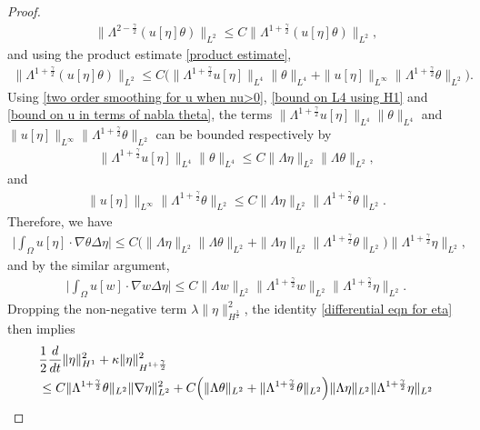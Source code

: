 \documentclass[10pt,a4paper]{amsart}
\newcommand{\intox}{\int_{\Omega}}
\begin{document}
\begin{proof}
\begin{align*}
\|\Lambda^{2-\frac{\gamma}{2}}(u[\eta]\theta)\|_{L^2}\le C\|\Lambda^{1+\frac{\gamma}{2}}(u[\eta]\theta)\|_{L^2},
\end{align*}
and using the product estimate \eqref{product estimate}, 
\begin{align*}
\|\Lambda^{1+\frac{\gamma}{2}}(u[\eta]\theta)\|_{L^2}\le C\Big(\|\Lambda^{1+\frac{\gamma}{2}}u[\eta]\|_{L^4}\|\theta\|_{L^4}+\|u[\eta]\|_{L^\infty}\|\Lambda^{1+\frac{\gamma}{2}}\theta\|_{L^2}\Big).
\end{align*}
Using \eqref{two order smoothing for u when nu>0}, \eqref{bound on L4 using H1} and \eqref{bound on u in terms of nabla theta}, the terms $\|\Lambda^{1+\frac{\gamma}{2}}u[\eta]\|_{L^4}\|\theta\|_{L^4}$ and $\|u[\eta]\|_{L^\infty}\|\Lambda^{1+\frac{\gamma}{2}}\theta\|_{L^2}$ can be bounded respectively by 
\begin{align*}
\|\Lambda^{1+\frac{\gamma}{2}}u[\eta]\|_{L^4}\|\theta\|_{L^4}\le C\|\Lambda\eta\|_{L^2}\|\Lambda\theta\|_{L^2},
\end{align*}
and 
\begin{align*}
\|u[\eta]\|_{L^\infty}\|\Lambda^{1+\frac{\gamma}{2}}\theta\|_{L^2}\le C\|\Lambda \eta\|_{L^2}\|\Lambda^{1+\frac{\gamma}{2}}\theta\|_{L^2}.
\end{align*}
Therefore, we have
\begin{align*}
\Big|\intox u[\eta]\cdot\nabla\theta\Delta\eta\Big|\le C\Big(\|\Lambda\eta\|_{L^2}\|\Lambda\theta\|_{L^2}+\|\Lambda \eta\|_{L^2}\|\Lambda^{1+\frac{\gamma}{2}}\theta\|_{L^2}\Big)\|\Lambda^{1+\frac{\gamma}{2}}\eta\|_{L^2},
\end{align*} 
and by the similar argument,
\begin{align*}
\Big|\intox u[w]\cdot\nabla w\Delta\eta\Big|\le C\|\Lambda w\|_{L^2}\|\Lambda^{1+\frac{\gamma}{2}}w\|_{L^2}\|\Lambda^{1+\frac{\gamma}{2}}\eta\|_{L^2}.
\end{align*}
Dropping the non-negative term $\lambda\|\eta\|^2_{H^{\frac{3}{2}}}$, the identity \eqref{differential eqn for eta} then implies
\begin{align}\label{differential eqn for eta step 2}
&\frac{1}{2}\frac{d}{dt}\|\eta\|^2_{H^1}+\kappa\|\eta\|^2_{H^{1+\frac{\gamma}{2}}}\notag\\
&\le C\|\Lambda^{1+\frac{\gamma}{2}}\theta\|_{L^2}\|\nabla\eta\|^2_{L^2}+C\Big(\|\Lambda\theta\|_{L^2}+\|\Lambda^{1+\frac{\gamma}{2}}\theta\|_{L^2}\Big)\|\Lambda \eta\|_{L^2}\|\Lambda^{1+\frac{\gamma}{2}}\eta\|_{L^2}\notag\\

\end{align}
\end{proof}
\end{document}
